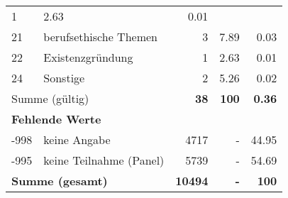 \begin{longtable}{lXrrr}
       \num{1} &
       \num[round-mode=places,round-precision=2]{2.63} &
         \num[round-mode=places,round-precision=2]{0.01} \\

     21 &
     \multicolumn{1}{X}{ berufsethische Themen   } &


       \num{3} &
       \num[round-mode=places,round-precision=2]{7.89} &
         \num[round-mode=places,round-precision=2]{0.03} \\

     22 &
     \multicolumn{1}{X}{ Existenzgründung   } &


       \num{1} &
       \num[round-mode=places,round-precision=2]{2.63} &
         \num[round-mode=places,round-precision=2]{0.01} \\

     24 &
     \multicolumn{1}{X}{ Sonstige   } &


       \num{2} &
       \num[round-mode=places,round-precision=2]{5.26} &
         \num[round-mode=places,round-precision=2]{0.02} \\
     \midrule
     \multicolumn{2}{l}{Summe (gültig)} &
       \textbf{\num{38}} &
     \textbf{\num{100}} &
       \textbf{\num[round-mode=places,round-precision=2]{0.36}} \\
     \multicolumn{5}{l}{\textbf{Fehlende Werte}}\\
       -998 &
       keine Angabe &
         \num{4717} &
        - &
         \num[round-mode=places,round-precision=2]{44.95} \\
       -995 &
       keine Teilnahme (Panel) &
         \num{5739} &
        - &
         \num[round-mode=places,round-precision=2]{54.69} \\
     \midrule
     \multicolumn{2}{l}{\textbf{Summe (gesamt)}} &
          \textbf{\num{10494}} &
        \textbf{-} &
        \textbf{\num{100}} \\
     \bottomrule
     \end{longtable}
     

